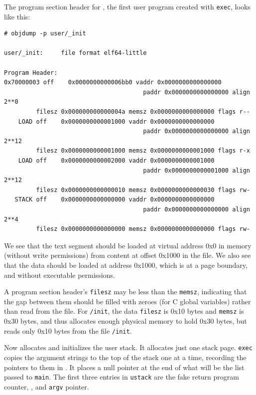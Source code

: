 The program section header for
,
the first user program created with
\lstinline{exec},
looks like this:
\begin{footnotesize}
\begin{verbatim}
# objdump -p user/_init

user/_init:     file format elf64-little

Program Header:
0x70000003 off    0x0000000000006bb0 vaddr 0x0000000000000000
                                       paddr 0x0000000000000000 align 2**0
         filesz 0x000000000000004a memsz 0x0000000000000000 flags r--
    LOAD off    0x0000000000001000 vaddr 0x0000000000000000
                                       paddr 0x0000000000000000 align 2**12
         filesz 0x0000000000001000 memsz 0x0000000000001000 flags r-x
    LOAD off    0x0000000000002000 vaddr 0x0000000000001000
                                       paddr 0x0000000000001000 align 2**12
         filesz 0x0000000000000010 memsz 0x0000000000000030 flags rw-
   STACK off    0x0000000000000000 vaddr 0x0000000000000000
                                       paddr 0x0000000000000000 align 2**4
         filesz 0x0000000000000000 memsz 0x0000000000000000 flags rw-
\end{verbatim}
\end{footnotesize}

We see that the text segment should be loaded at virtual address 0x0
in memory (without write permissions) from content at offset
0x1000 in the file. We also see that the data should be loaded at
address 0x1000, which is at a page boundary, and without executable
permissions.

A program section header's
\lstinline{filesz}
may be less than the
\lstinline{memsz},
indicating that the gap between them should be filled
with zeroes (for C global variables) rather than read from the file.
For
\lstinline{/init}, the data
\lstinline{filesz}
is 0x10 bytes and
\lstinline{memsz}
is 0x30 bytes,
and thus
allocates enough physical memory to hold 0x30 bytes, but reads only 0x10 bytes
from the file
\lstinline{/init}.

Now
allocates and initializes the user stack.
It allocates just one stack page.
\lstinline{exec}
copies the argument strings to the top of the stack
one at a time, recording the pointers to them in
.
It places a null pointer at the end of what will be the
list passed to
\lstinline{main}.
The first three entries in
\lstinline{ustack}
are the fake return program counter,
,
and
\lstinline{argv}
pointer.

